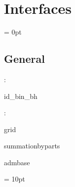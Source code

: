
\section{Interfaces} 


\parskip = 0pt

\vspace{3mm} \subsection*{General}

: 

id\_bin\_bh
\vspace{2mm}

: 

grid

summationbyparts

admbase
\vspace{2mm}

\vspace{5mm}\parskip = 10pt 
